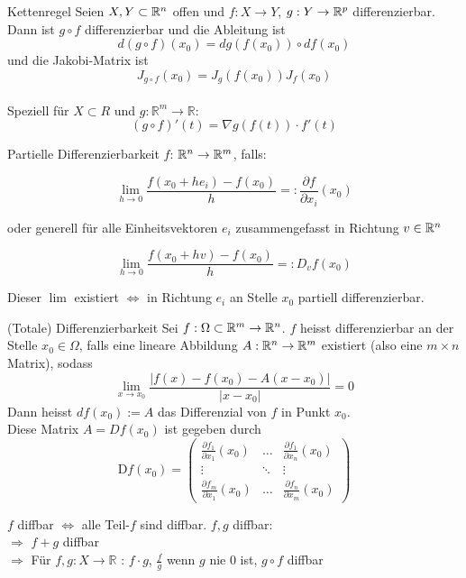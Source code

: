 \begin{Satz}{Kettenregel}{}
	Seien $X,Y \subset \mathbb{R}^n$ offen und $f: X \to Y$, $g: Y \to \mathbb{R}^p$ differenzierbar. Dann ist $g \circ f$ differenzierbar und die Ableitung ist \[d(g\circ f)(x_0) = dg(f(x_0))\circ df(x_0)\] und die Jakobi-Matrix ist \[J_{g\circ f}(x_0) = J_g(f(x_0))J_f(x_0)\] \\
	Speziell für $X \subset R$ und $g: \mathbb{R}^m \rightarrow \mathbb{R}$:
	\begin{equation*}
	    (g \circ f)'(t) = \nabla g (f(t)) \cdot f'(t)
	\end{equation*}
	
\end{Satz}
\begin{Definition}{Partielle Differenzierbarkeit}{}
	$f$: $\mathbb{R}^n \rightarrow \mathbb{R}^m$, falls:

	\[
    	\lim_{h \rightarrow 0} \frac{f(x_0 + h e_i)-f(x_0)}{h} =: \frac{\partial f}{\partial x_i}(x_0)
	\]

	oder generell für alle Einheitsvektoren $e_i$ zusammengefasst in Richtung $v \in \mathbb{R}^n$

	\[
    	\lim_{h \rightarrow 0} \frac{f(x_0 + h v)-f(x_0)}{h} =: D_v f(x_0)
	\]

	Dieser $\lim$ existiert $\Leftrightarrow$ in Richtung $e_i$ an Stelle $x_0$ partiell differenzierbar.
\end{Definition}
\begin{Definition}{(Totale) Differenzierbarkeit}{}
	Sei $f: \Omega \subset \mathbb{R}^m \to \mathbb{R}^n$. $f$ heisst differenzierbar an der Stelle $x_0 \in \Omega$, falls eine lineare Abbildung $A: \mathbb{R}^n \to \mathbb{R}^m$ existiert (also eine $m \times n$ Matrix), sodass \[\lim_{x \to x_0} \frac{|f(x) - f(x_0) - A(x - x_0)|}{|x - x_0|} = 0\] Dann heisst $df(x_0) := A$ das Differenzial von $f$ in Punkt $x_0$. \\
	Diese Matrix $A = Df(x_0)$ ist gegeben durch
	\[
		\text{D}f(x_0) =
        \begin{pmatrix}
            \frac{\partial f_1}{\partial x_1}(x_0)&\hdots&\frac{\partial f_1}{\partial x_n}(x_0)\\
            \vdots&\ddots&\vdots\\
            \frac{\partial f_m}{\partial x_1}(x_0)&\hdots&\frac{\partial f_n}{\partial x_m}(x_0)
        \end{pmatrix}
    \]
\end{Definition}
$f$ diffbar $\Leftrightarrow$ alle Teil-$f$ sind diffbar. $f,g$ diffbar:\\
$\Rightarrow$ $f+g$ diffbar\\
$\Rightarrow$ Für $f,g: X \rightarrow \mathbb{R}$ :  $f \cdot g$, $\frac{f}{g}$ wenn $g$ nie 0 ist, $g \circ f$ diffbar
